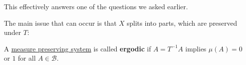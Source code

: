 \documentclass{article}
\begin{document}
This effectively answers one %
of the questions we asked earlier. %

The main issue that can occur is that $X$ splits into parts, which are preserved under $T$:
\begin{center}
\end{center}

\begin{defi}[Ergodic]
  A \hyperlink{def:mps}{measure preserving system} is called \textbf{ergodic} if $A = T^{-1}A$ implies $\mu(A) = 0$ or $1$ for all $A \in \mathcal{B}$.
\end{defi}
\end{document}
